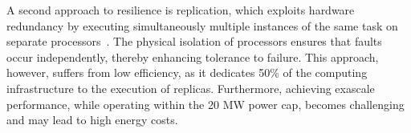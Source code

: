 A second approach to resilience is replication, which exploits hardware redundancy by executing simultaneously multiple instances of the same task on separate processors~\cite{bartlett_1981_nonstop}. The physical isolation of processors ensures that faults occur independently, thereby enhancing tolerance to failure. This approach, however, suffers from low efficiency, as it dedicates 50\% of the computing infrastructure to the execution of replicas. Furthermore, achieving exascale performance, while operating within the 20 MW power cap, becomes challenging and may lead to high energy costs. 


